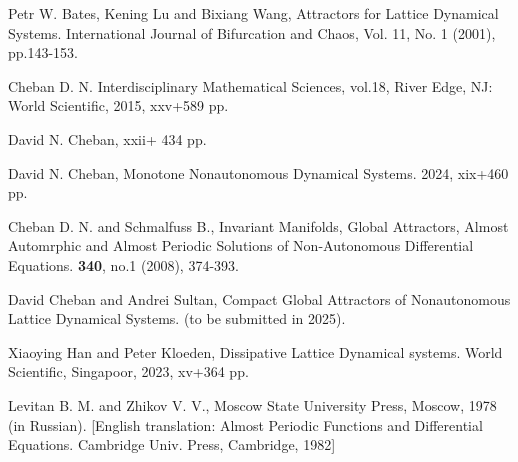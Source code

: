 \documentclass{amsart}%
\begin{document}
\begin{thebibliography}{100}

 Petr W. Bates, Kening Lu and Bixiang Wang,
\newblock Attractors for Lattice Dynamical Systems.
\newblock International Journal of Bifurcation
and Chaos, Vol. 11, No. 1 (2001), pp.143-153.


 Cheban D. N.
\newblock Interdisciplinary Mathematical Sciences,
vol.18, River Edge, NJ: World Scientific, 2015, xxv+589 pp.


 David N. Cheban,
 xxii+ 434 pp.

 David N. Cheban,
\newblock Monotone Nonautonomous Dynamical Systems.
 2024, xix+460 pp.

 Cheban D. N. and Schmalfuss B.,
\newblock Invariant Manifolds, Global Attractors,
Almost Automrphic and Almost Periodic Solutions of Non-Autonomous
Differential Equations.
 \textbf{340}, no.1 (2008), 374-393.

 David Cheban and Andrei Sultan,
\newblock Compact Global Attractors of Nonautonomous Lattice Dynamical Systems.
 (to be submitted in 2025).


 Xiaoying Han and Peter Kloeden,
\newblock Dissipative Lattice Dynamical systems.
\newblock World Scientific, Singapoor, 2023, xv+364 pp.


 Levitan B. M. and Zhikov V. V.,
\newblock Moscow State University Press, Moscow, 1978 (in Russian).
[English translation: Almost Periodic Functions and Differential
Equations. Cambridge Univ. Press, Cambridge, 1982]



\end{thebibliography}
\end{document}
